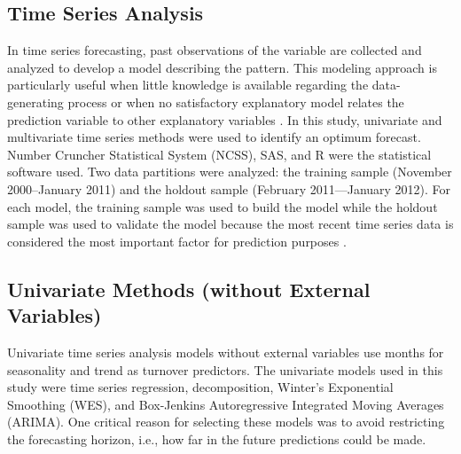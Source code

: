 \subsection{Time Series Analysis}
In time series forecasting, past observations of the variable are collected and analyzed to develop a model describing the pattern. This modeling approach is particularly useful when little knowledge is available regarding  the data-generating process or when no satisfactory explanatory model relates the prediction variable to other explanatory variables \citep{zhang2003}. In this study, univariate and multivariate time series methods were used to identify an optimum forecast. Number Cruncher Statistical System (NCSS), SAS, and R were the statistical software used. Two data partitions were analyzed: the training sample (November 2000–January 2011) and the holdout sample (February 2011—January 2012). For each model, the training sample was used to build the model while the holdout sample was used to validate the model because the most recent time series data is considered the most important factor for prediction purposes \citep{bergmeir2012}. 
\subsection{Univariate Methods (without External Variables)}
Univariate time series analysis models without external variables use months for seasonality and trend as turnover predictors. The univariate models used in this study were time series regression, decomposition, Winter's Exponential Smoothing (WES), and Box-Jenkins Autoregressive Integrated Moving Averages (ARIMA). One critical reason for selecting these models was to avoid restricting the forecasting horizon, i.e., how far in the future predictions could be made. 

